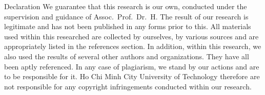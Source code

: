 \begin{preface}{Declaration}
  We guarantee that this research is our own, conducted under the supervision and guidance of Assoc.~Prof.~Dr.~H.
  The result of our research is legitimate and has not been published in any forms prior to this.
  All materials used within this researched are collected by ourselves, by various sources and are appropriately listed in the references section.
  In addition, within this research, we also used the results of several other authors and organizations.
  They have all been aptly referenced.
  In any case of plagiarism, we stand by our actions and are to be responsible for it.
  Ho Chi Minh City University of Technology therefore are not responsible for any copyright infringements conducted within our research.
\end{preface}
